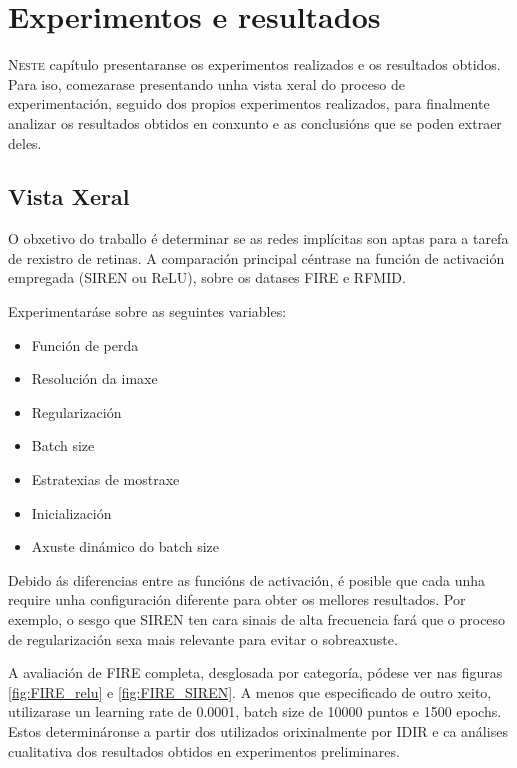 \chapter{Experimentos e resultados}
\label{chap:Experimentos e resultados}
\lettrine{N}{este} capítulo presentaranse os experimentos realizados e os resultados obtidos.
Para iso, comezarase presentando unha vista xeral do proceso de experimentación, 
seguido dos propios experimentos realizados, para finalmente analizar os resultados obtidos en conxunto e as conclusións que se poden extraer deles.

\section{Vista Xeral}
\label{sec:Vista Xeral}

O obxetivo do traballo é determinar se as redes implícitas son aptas para a tarefa de rexistro de retinas.
A comparación principal céntrase na función de activación empregada (SIREN ou ReLU), sobre os datases FIRE e RFMID.

Experimentaráse sobre as seguintes variables:

\begin{itemize}
    \item Función de perda
    \item Resolución da imaxe
    \item Regularización
    \item Batch size
    \item Estratexias de mostraxe
    \item Inicialización
    \item Axuste dinámico do batch size
\end{itemize}

Debido ás diferencias entre as funcións de activación, é posible que cada unha require unha configuración diferente para obter os mellores resultados.
Por exemplo, o sesgo que SIREN ten cara sinais de alta frecuencia fará que o proceso de regularización sexa mais relevante para evitar o sobreaxuste.


A avaliación de FIRE completa, desglosada por categoría, pódese ver nas figuras \ref{fig:FIRE_relu} e \ref{fig:FIRE_SIREN}.
A menos que especificado de outro xeito, utilizarase un learning rate de 0.0001, batch size de 10000 puntos e 1500 epochs. 
Estos determináronse a partir dos utilizados orixinalmente por IDIR e ca análises cualitativa dos resultados obtidos en experimentos preliminares.


